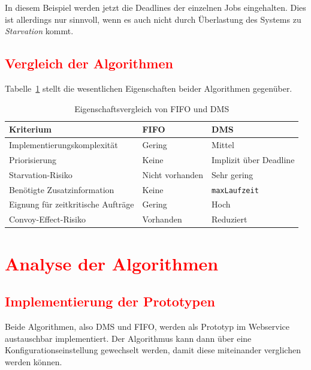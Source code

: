 \documentclass[
    12pt,               
    a4paper,            
    ngerman,            
    parskip=half,       
    headings=normal,   
    numbers=enddot,     
    toc=chapterentrywithdots 
]{scrreprt}\usepackage[utf8]{inputenc}
\begin{document}
In diesem Beispiel werden jetzt die Deadlines der einzelnen Jobs eingehalten. Dies ist allerdings nur sinnvoll, wenn es auch nicht durch Überlastung des Systems zu \textit{Starvation} kommt.

\subsection{\textcolor{red}{Vergleich der Algorithmen}}

Tabelle~\ref{tab:algo_vergleich} stellt die wesentlichen Eigenschaften beider Algorithmen gegenüber.

\begin{table}[H]
\centering
{\setlength{\arrayrulewidth}{0.3pt}
\begin{tabular}{|p{}|p{}|p{}|}
    \hline
    \textbf{Kriterium} & \textbf{FIFO} & \textbf{DMS} \\
    \hline
    Implementierungskomplexität & Gering & Mittel \\
    \hline
    Priorisierung & Keine & Implizit über Deadline \\
    \hline
    Starvation-Risiko & Nicht vorhanden & Sehr gering \\
    \hline
    Benötigte Zusatzinformation & Keine & \texttt{maxLaufzeit} \\
    \hline
    Eignung für zeitkritische Aufträge & Gering & Hoch \\
    \hline
    Convoy-Effect-Risiko & Vorhanden & Reduziert \\
    \hline
\end{tabular}}
\caption{Eigenschaftsvergleich von FIFO und DMS}
\label{tab:algo_vergleich}
\end{table}
 
\section{\textcolor{red}{Analyse der Algorithmen}}
\subsection{\textcolor{red}{Implementierung der Prototypen}}
Beide Algorithmen, also DMS und FIFO, werden als Prototyp im Webservice austauschbar implementiert. Der Algorithmus kann dann über eine Konfigurationseinstellung gewechselt werden, damit diese miteinander verglichen werden können. 
\end{document}
